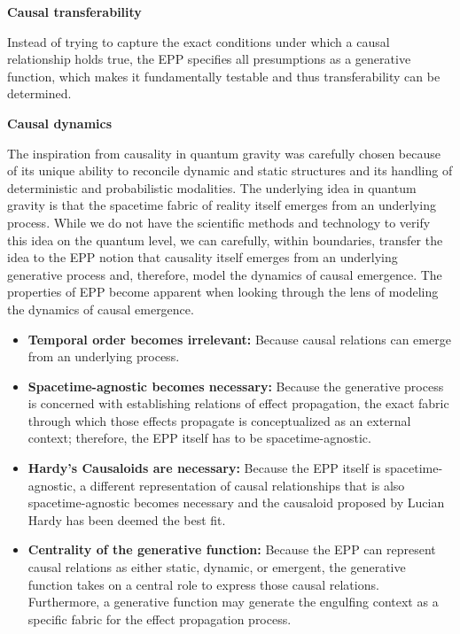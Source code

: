 \textbf{Causal transferability}

Instead of trying to capture the exact conditions under which a causal relationship holds true, the EPP specifies all presumptions as a generative function, which makes it fundamentally testable and thus transferability can be determined.

\textbf{Causal dynamics}

The inspiration from causality in quantum gravity was carefully chosen because of its unique ability to reconcile dynamic and static structures and its handling of deterministic and probabilistic modalities. The underlying idea in quantum gravity is that the spacetime fabric of reality itself emerges from an underlying process. While we do not have the scientific methods and technology to verify this idea on the quantum level, we can carefully, within boundaries, transfer the idea to the EPP notion that causality itself emerges from an underlying generative process and, therefore, model the dynamics of causal emergence. The properties of EPP become apparent when looking through the lens of modeling the dynamics of causal emergence.

\begin{itemize}
    \item \textbf{Temporal order becomes irrelevant:} Because causal relations can emerge from an underlying process.
    \item \textbf{Spacetime-agnostic becomes necessary:} Because the generative process is concerned with establishing relations of effect propagation, the exact fabric through which those effects propagate is conceptualized as an external context; therefore, the EPP itself has to be spacetime-agnostic.
    \item \textbf{Hardy's Causaloids are necessary:} Because the EPP itself is spacetime-agnostic, a different representation of causal relationships that is also spacetime-agnostic becomes necessary and the causaloid proposed by Lucian Hardy has been deemed the best fit.
    \item \textbf{Centrality of the generative function:} Because the EPP can represent causal relations as either static, dynamic, or emergent, the generative function takes on a central role to express those causal relations. Furthermore, a generative function may generate the engulfing context as a specific fabric for the effect propagation process.
\end{itemize}

\newpage
